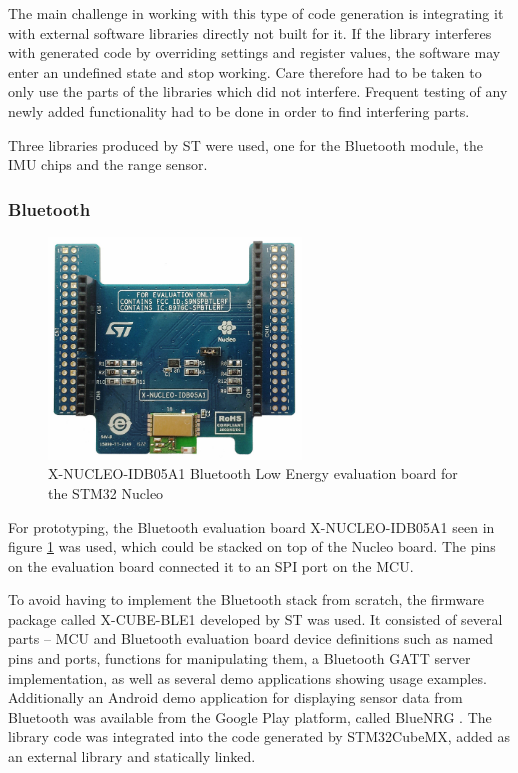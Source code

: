 The main challenge in working with this type of code generation is integrating it with external software libraries directly not built for it. If the library interferes with generated code by overriding settings and register values, the software may enter an undefined state and stop working. Care therefore had to be taken to only use the parts of the libraries which did not interfere. Frequent testing of any newly added functionality had to be done in order to find interfering parts.

Three libraries produced by ST were used, one for the Bluetooth module, the IMU chips and the range sensor.

\subsubsection{Bluetooth}
\label{bluetooth}

\begin{figure}[H]
\centering
\includegraphics[width=0.6\textwidth]{Figures/x-nucleo-idb05a1.jpg}
\caption{X-NUCLEO-IDB05A1 Bluetooth Low Energy evaluation board for the STM32 Nucleo}
\label{bt-eval-board}
\end{figure}

For prototyping, the Bluetooth evaluation board X-NUCLEO-IDB05A1 \cite{x-nucleo-idb05a1} seen in figure \ref{bt-eval-board} was used, which could be stacked on top of the Nucleo board. The pins on the evaluation board connected it to an SPI port on the MCU.

To avoid having to implement the Bluetooth stack from scratch, the firmware package called X-CUBE-BLE1 \cite{x-cube-ble1} developed by ST was used. It consisted of several parts -- MCU and Bluetooth evaluation board device definitions such as named pins and ports, functions for manipulating them, a Bluetooth GATT server implementation, as well as several demo applications showing usage examples. Additionally an Android demo application for displaying sensor data from Bluetooth was available from the Google Play platform, called BlueNRG \cite{bluenrg-app}. The library code was integrated into the code generated by STM32CubeMX, added as an external library and statically linked.

